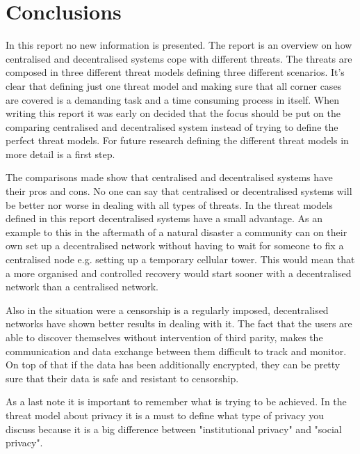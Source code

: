 \section{Conclusions}
In this report no new information is presented.
The report is an overview on how centralised and decentralised systems cope with different threats.
The threats are composed in three different threat models defining three different scenarios.
It's clear that defining just one threat model and making sure that all corner cases are covered is a demanding task and a time consuming process in itself.
When writing this report it was early on decided that the focus should be put on the comparing centralised and decentralised system instead of trying to define the perfect threat models.
For future research defining the different threat models in more detail is a first step.

The comparisons made show that centralised and decentralised systems have their pros and cons.
No one can say that centralised or decentralised systems will be better nor worse in dealing with all types of threats.
In the threat models defined in this report decentralised systems have a small advantage.
As an example to this in the aftermath of a natural disaster a community can on their own set up a decentralised network without having to wait for someone to fix a centralised node e.g. setting up a temporary cellular tower.
This would mean that a more organised and controlled recovery would start sooner with a decentralised network than a centralised network.

Also in the situation were a censorship is a regularly imposed, decentralised networks have shown better results in dealing with it. The fact that the users are able to discover themselves without intervention of third parity, makes the communication and data exchange between them difficult to track and monitor. On top of that if the data has been additionally encrypted, they can be pretty sure that their data is safe and resistant to censorship.

As a last note it is important to remember what is trying to be achieved.
In the threat model about privacy it is a must to define what type of privacy you discuss because it is a big difference between "institutional privacy" and "social privacy".
